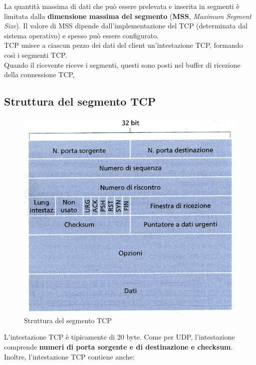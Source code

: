 \documentclass[11pt,a4paper]{book}
\begin{document}
La quantità massima di dati che può essere prelevata e inserita in segmenti è limitata dalla \textbf{dimensione massima del segmento} (\textbf{MSS}, \textit{Maximum Segment Size}). Il valore di MSS dipende dall'implementazione del TCP (determinata dal sistema operativo) e spesso può essere configurato. \\
TCP unisce a ciascun pezzo dei dati del client un'intestazione TCP, formando così i segmenti TCP. \\
Quando il ricevente riceve i segmenti, questi sono posti nel buffer di ricezione della connessione TCP,
\subsection{Struttura del segmento TCP}
\begin{figure}
	\begin{center}
		\includegraphics[scale=0.6]{img/031.png}
		\caption{Struttura del segmento TCP}
	\end{center}
\end{figure}
L'intestazione TCP è tipicamente di 20 byte. Come per UDP, l'intestazione comprende \textbf{numeri di porta sorgente e di destinazione e checksum}. Inoltre, l'intestazione TCP contiene anche:
\end{document}
